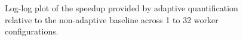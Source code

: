 \begin{figure}[htbp]
  \centering
  
  \caption{Log-log plot of the speedup provided by adaptive quantification relative to the non-adaptive baseline across 1 to 32 worker configurations.}
  \label{fig:adaptive_quantification_speedup}
\end{figure}